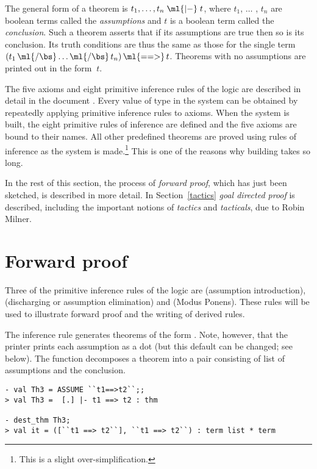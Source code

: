 The general form of a theorem is $t_1,\ldots,t_n\;\ml{|-}\;t$, where $t_1$, $\ldots$ , $t_n$ are boolean terms called the {\it assumptions} and $t$ is a boolean term called the {\it conclusion\/}.
Such a theorem asserts that if its assumptions are true then so is its conclusion.
Its truth conditions are thus the same as those for the
single term $(t_1\,\ml{/\bs}\ldots\ml{/\bs}\,t_n)\,\ml{==>}\,t$.
Theorems with no assumptions are printed out in the form \ml{|-}$\ t$.

The five axioms and eight primitive inference rules of the \HOL{} logic are described in detail in the document \DESCRIPTION.
Every value of type  in the \HOL{} system can be obtained by repeatedly applying primitive inference rules to axioms.
When the \HOL{} system is built, the eight primitive rules of inference are defined and the five axioms are bound to their \ML{} names.
All other predefined theorems are proved using rules of inference as the system is made.\footnote{This is a slight over-simplification.}
This is one of the reasons why building  takes so long.

In the rest of this section, the process of \emph{forward proof}, which has just been sketched, is described in more detail.
In Section~\ref{tactics} \emph{goal directed proof} is described, including the important notions of \emph{tactics} and \emph{tacticals}, due to Robin Milner.

\section{Forward proof}
\label{forward}

Three of the primitive inference rules of the \HOL{} logic are
 (assumption introduction),  (discharging or
assumption elimination) and  (Modus Ponens).  These rules will
be used to illustrate forward proof and the writing of derived rules.

The inference rule  generates theorems of the form . Note, however, that the \ML{} printer prints each
assumption as a dot (but this default can be changed; see below).  The
function  decomposes a theorem into a pair consisting of
list of assumptions and the conclusion.

\begin{session}
\begin{verbatim}
- val Th3 = ASSUME ``t1==>t2``;;
> val Th3 =  [.] |- t1 ==> t2 : thm

- dest_thm Th3;
> val it = ([``t1 ==> t2``], ``t1 ==> t2``) : term list * term
\end{verbatim}
\end{session}

